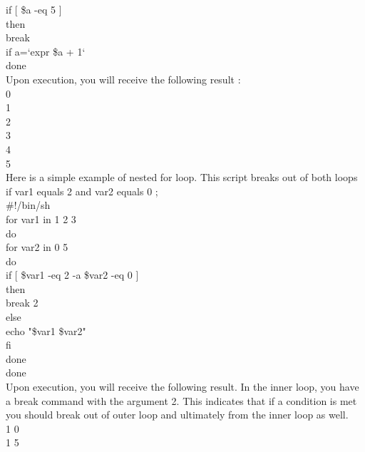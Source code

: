 \documentclass{article}
\begin{document}
   if [ \$a -eq 5 ]\\
   then\\
      break\\
   if
   a=`expr \$a + 1`\\
done\\
Upon execution, you will receive the following result :\\
0\\
1\\
2\\
3\\
4\\
5\\
Here is a simple example of nested for loop. This script breaks out of both loops if var1 equals 2 and var2 equals 0 ;\\
\#!/bin/sh\\
for var1 in 1 2 3\\
do\\
   for var2 in 0 5\\
   do\\
      if [ \$var1 -eq 2 -a \$var2 -eq 0 ]\\
      then\\
         break 2\\
      else\\
         echo "\$var1 \$var2"\\
      fi\\
   done\\
done\\
Upon execution, you will receive the following result. In the inner loop, you have a break command with the argument 2. This indicates that if a condition is met you should break out of outer loop and ultimately from the inner loop as well.\\
1 0\\
1 5\\

\end{document}
